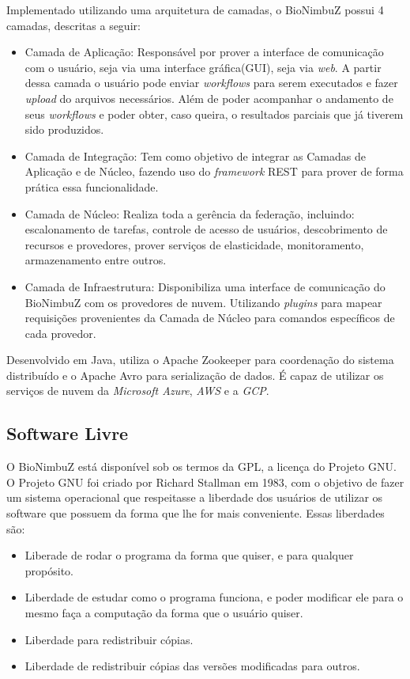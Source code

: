 Implementado utilizando uma arquitetura de camadas, o BioNimbuZ possui 4 camadas, descritas a seguir:
\begin{itemize}
	\item Camada de Aplicação: Responsável por prover a interface de comunicação com o usuário, seja via uma interface gráfica(GUI), seja via \textit{web}. A partir dessa camada o usuário pode enviar \textit{workflows} para serem executados e fazer \textit{upload} do arquivos necessários. Além de poder acompanhar o andamento de seus \textit{workflows} e poder obter, caso queira, o resultados parciais que já tiverem sido produzidos. 
	
	\item Camada de Integração: Tem como objetivo de integrar as Camadas de Aplicação e de Núcleo, fazendo uso do \textit{framework} \acrfull{REST} para prover de forma prática essa funcionalidade.
	
	\item Camada de Núcleo: Realiza toda a gerência da federação, incluindo: escalonamento de tarefas, controle de acesso de usuários, descobrimento de recursos e provedores, prover serviços de elasticidade, monitoramento, armazenamento entre outros.
	
	\item Camada de Infraestrutura: Disponibiliza uma interface de comunicação do BioNimbuZ com os provedores de nuvem. Utilizando \textit{plugins} para mapear requisições provenientes da Camada de Núcleo para comandos específicos de cada provedor.
\end{itemize}

Desenvolvido em Java, utiliza o Apache Zookeeper\cite{Zookeeper} para coordenação do sistema distribuído e o Apache Avro\cite{Avro} para serialização de dados. É capaz de utilizar os serviços de nuvem da \textit{Microsoft Azure}, \textit{\acrshort{AWS}} e a \textit{\acrshort{GCP}}.


\subsection{Software Livre}
O BioNimbuZ está disponível sob os termos da \acrfull{GPL}, a licença do Projeto \acrfull{GNU}. O Projeto GNU foi criado por Richard Stallman em 1983, com o objetivo de fazer um sistema operacional que respeitasse a liberdade dos usuários de utilizar os software que possuem da forma que lhe for mais conveniente. Essas liberdades são\cite{Free_Software}:

\begin{itemize}
	\item Liberade de rodar o programa da forma que quiser, e para qualquer propósito.
	\item Liberdade de estudar como o programa funciona, e poder modificar ele para o mesmo faça a computação da forma que o usuário quiser.
	\item Liberdade para redistribuir cópias.
	\item Liberdade de redistribuir cópias das versões modificadas para outros.
\end{itemize}

